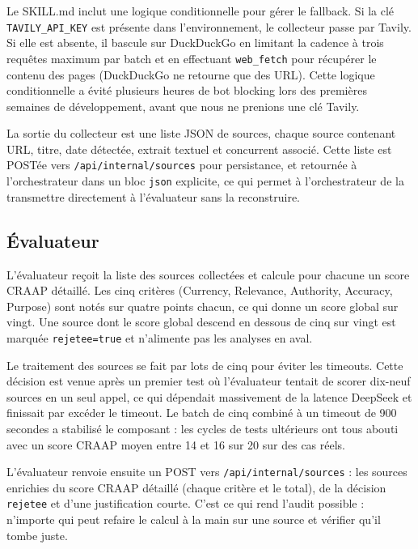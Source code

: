 \documentclass[12pt,a4paper,openany]{report}
\begin{document}
Le SKILL.md inclut une logique conditionnelle pour gérer le fallback. Si la clé \texttt{TAVILY\_API\_KEY} est présente dans l'environnement, le collecteur passe par Tavily. Si elle est absente, il bascule sur DuckDuckGo en limitant la cadence à trois requêtes maximum par batch et en effectuant \texttt{web\_fetch} pour récupérer le contenu des pages (DuckDuckGo ne retourne que des URL). Cette logique conditionnelle a évité plusieurs heures de bot blocking lors des premières semaines de développement, avant que nous ne prenions une clé Tavily.

La sortie du collecteur est une liste JSON de sources, chaque source contenant URL, titre, date détectée, extrait textuel et concurrent associé. Cette liste est POSTée vers \texttt{/api/internal/sources} pour persistance, et retournée à l'orchestrateur dans un bloc \texttt{json} explicite, ce qui permet à l'orchestrateur de la transmettre directement à l'évaluateur sans la reconstruire.

\subsection{Évaluateur}
\label{sec:skill-evaluateur}

L'évaluateur reçoit la liste des sources collectées et calcule pour chacune un score CRAAP détaillé. Les cinq critères (Currency, Relevance, Authority, Accuracy, Purpose) sont notés sur quatre points chacun, ce qui donne un score global sur vingt. Une source dont le score global descend en dessous de cinq sur vingt est marquée \texttt{rejetee=true} et n'alimente pas les analyses en aval.

Le traitement des sources se fait par lots de cinq pour éviter les timeouts. Cette décision est venue après un premier test où l'évaluateur tentait de scorer dix-neuf sources en un seul appel, ce qui dépendait massivement de la latence DeepSeek et finissait par excéder le timeout. Le batch de cinq combiné à un timeout de 900 secondes a stabilisé le composant : les cycles de tests ultérieurs ont tous abouti avec un score CRAAP moyen entre 14 et 16 sur 20 sur des cas réels.

L'évaluateur renvoie ensuite un POST vers \texttt{/api/internal/sources} : les sources enrichies du score CRAAP détaillé (chaque critère et le total), de la décision \texttt{rejetee} et d'une justification courte. C'est ce qui rend l'audit possible : n'importe qui peut refaire le calcul à la main sur une source et vérifier qu'il tombe juste.
\end{document}
